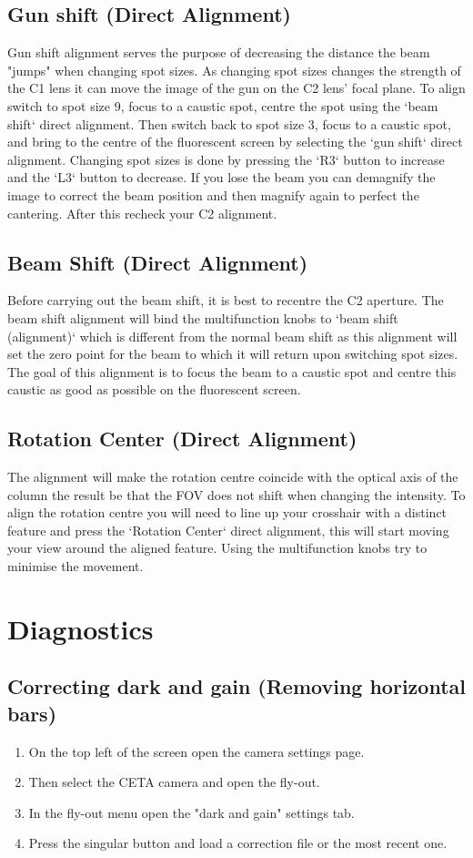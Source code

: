 \documentclass[a4paper]{scrartcl}
\begin{document}
\subsection*{Gun shift (Direct Alignment)}
Gun shift alignment serves the purpose of decreasing the distance the beam "jumps" when changing spot sizes. As changing spot sizes changes the strength of the C1 lens it can move the image of the gun on the C2 lens' focal plane. To align switch to spot size 9, focus to a caustic spot, centre the spot using the `beam shift` direct alignment. Then switch back to spot size 3, focus to a caustic spot, and bring to the centre of the fluorescent screen by selecting the `gun shift` direct alignment. Changing spot sizes is done by pressing the `R3` button to increase and the `L3` button to decrease. If you lose the beam you can demagnify the image to correct the beam position and then magnify again to perfect the cantering. After this recheck your C2 alignment.

\subsection*{Beam Shift (Direct Alignment)}
Before carrying out the beam shift, it is best to recentre the C2 aperture. The beam shift alignment will bind the multifunction knobs to `beam shift (alignment)` which is different from the normal beam shift as this alignment will set the zero point for the beam to which it will return upon switching spot sizes. The goal of this alignment is to focus the beam to a caustic spot and centre this caustic as good as possible on the fluorescent screen.

\subsection*{Rotation Center (Direct Alignment)}
The alignment will make the rotation centre coincide with the optical axis of the column the result be that the FOV does not shift when changing the intensity. To align the rotation centre you will need to line up your crosshair with a distinct feature and press the `Rotation Center` direct alignment, this will start moving your view around the aligned feature. Using the multifunction knobs try to minimise the movement.

\section*{Diagnostics}
\subsection*{Correcting dark and gain (Removing horizontal bars)}
\begin{enumerate}
	\item On the top left of the screen open the camera settings page.
	\item Then select the CETA camera and open the fly-out.
	\item In the fly-out menu open the "dark and gain" settings tab.
	\item Press the singular button and load a correction file or the most recent one.
\end{enumerate}
\end{document}
